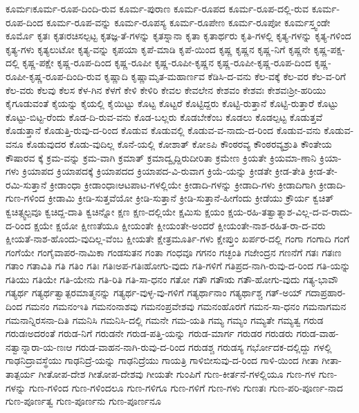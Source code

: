 {ಕೂರ್ಮಃಕೂರ್ಮ-ರೂಪ-ದಿಂದಿ-ರುವ
ಕೂರ್ಮ-ಪುರಾಣ
ಕೂರ್ಮ-ರೂಪದ
ಕೂರ್ಮ-ರೂಪ-ದಲ್ಲಿ-ರುವ
ಕೂರ್ಮ-ರೂಪ-ದಿಂದ
ಕೂರ್ಮ-ರೂಪ-ವನ್ನು
ಕೂರ್ಮ-ರೂಪಸ್ಯ
ಕೂರ್ಮ-ರೂಪೇಣ
ಕೂರ್ಮ-ರೂಪೋ
ಕೂರ್ಮಸ್ತ್ವಂಡೇ
ಕೂರ್ಮೊ
ಕೃತಃ
ಕೃತಃರಚಿಸಲ್ಪಟ್ಟ
ಕೃತಜ್ಞ-ತೆ-ಗಳನ್ನು
ಕೃತಸ್ನಾನಾ
ಕೃತಾ
ಕೃತಾರ್ಥರು
ಕೃತಿ-ಗಳಲ್ಲಿ
ಕೃತ್ಯ-ಗಳನ್ನು
ಕೃತ್ಯ-ಗಳಿಂದ
ಕೃತ್ಯ-ಗಳು
ಕೃತ್ಯಲುಟೋ
ಕೃತ್ಯ-ವನ್ನು
ಕೃಪಯಾ
ಕೃಪೆ-ಮಾಡಿ
ಕೃಪೆ-ಯಿಂದ
ಕೃಷ್ಣ
ಕೃಷ್ಣನ
ಕೃಷ್ಣ-ನಿಗೆ
ಕೃಷ್ಣನೇ
ಕೃಷ್ಣ-ಪಕ್ಷ-ದಲ್ಲಿ
ಕೃಷ್ಣ-ಪಕ್ಷೇ
ಕೃಷ್ಣ-ರೂಪ-ದಿಂದ
ಕೃಷ್ಣ-ರೂಪೀ
ಕೃಷ್ಣ-ರೂಪೀ-ಕೃಷ್ಣನ
ಕೃಷ್ಣ-ರೂಪೀ-ಕೃಷ್ಣ-ರೂಪ-ದಿಂದ
ಕೃಷ್ಣ-ರೂಪೀ-ಕೃಷ್ಣ-ರೂಪ-ದಿಂದಿ-ರುವ
ಕೃಷ್ಣಾದಿ
ಕೃಷ್ಣಾಮೃತ-ಮಹಾರ್ಣವ
ಕೆಡಿಸಿ-ದ-ವನು
ಕೆಲ-ವಕ್ಕೆ
ಕೆಲ-ವರ
ಕೆಲ-ವ-ರಿಗೆ
ಕೆಲ-ವರು
ಕೆಲವು
ಕೆಲಸ
ಕೆಳ-ಗಿನ
ಕೆಳಗೆ
ಕೇಳಿ
ಕೇಳಿರಿ
ಕೇವಲ
ಕೇವಲೇನ
ಕೇಶವಂ
ಕೇಶವಃ
ಕೇಶವಃಶ್ರೀ-ಹರಿಯು
ಕೈಗೂಡುವಂತೆ
ಕೈಯನ್ನು
ಕೈಯಲ್ಲಿ
ಕೈಯಿಟ್ಟು
ಕೊಟ್ಟ
ಕೊಟ್ಟರೆ
ಕೊಟ್ಟಿದ್ದರು
ಕೊಟ್ಟಿ-ರುತ್ತಾನೆ
ಕೊಟ್ಟಿ-ರುತ್ತಾರೆ
ಕೊಟ್ಟು
ಕೊಟ್ಟು-ಬಿಟ್ಟ-ರೆಂದು
ಕೊಡ-ದಿ-ರುವ-ವನು
ಕೊಡ-ಬಲ್ಲರು
ಕೊಡಬೇಕೆಂಬ
ಕೊಡಲು
ಕೊಡಲ್ಪಟ್ಟ
ಕೊಡುತ್ತವೆ
ಕೊಡುತ್ತಾನೆ
ಕೊಡುತ್ತಿ-ರುವು-ದ-ರಿಂದ
ಕೊಡುವ
ಕೊಡುವಲ್ಲಿ
ಕೊಡುವ-ವ-ನಾದು-ದ-ರಿಂದ
ಕೊಡುವ-ವನು
ಕೊಡುವ-ವನೂ
ಕೊಡುವುದರ
ಕೊಡು-ವುದಿಲ್ಲ
ಕೊನೆ-ಯಲ್ಲಿ
ಕೋಶಾತ್
ಕೋಽಪಿ
ಕೌಂಠರವ್ಯ
ಕೌಂಠರವ್ಯಶ್ರುತಿ
ಕೌಂತೇಯ
ಕೌಷಾರವ
ಕ್ಕೆ
ಕ್ರಮ-ವನ್ನು
ಕ್ರಮ-ವಾಗಿ
ಕ್ರಮಾತ್
ಕ್ರಮಾದ್ವೃದ್ದಿರುದೀರಿತಾ
ಕ್ರಮೇಣ
ಕ್ರಿಯತೇ
ಕ್ರಿಯಮಾ-ಣಾನಿ
ಕ್ರಿಯಾ-ಗಳು
ಕ್ರಿಯಾಪದ
ಕ್ರಿಯಾಪದಕ್ಕೆ
ಕ್ರಿಯಾಪದದ
ಕ್ರಿಯಾಪದ-ವಿ-ರುವಾಗ
ಕ್ರಿಯೆ-ಯನ್ನು
ಕ್ರೀಡತೇ
ಕ್ರೀಡ-ತೇತಿ
ಕ್ರೀಡ-ತೇ-ರಮಿ-ಸುತ್ತಾನೆ
ಕ್ರೀಡಾಂಧಾ
ಕ್ರೀಡಾಂಧಾಃಆಟಪಾಟ-ಗಳಲ್ಲಿಯೇ
ಕ್ರೀಡಾದಿ-ಗಳನ್ನು
ಕ್ರೀಡಾದಿ-ಗಳು
ಕ್ರೀಡಾದಿಗಾಗಿ
ಕ್ರೀಡಾದಿ-ಗುಣ-ಗಳಿಂದ
ಕ್ರೀಡಾಮಿ
ಕ್ರೀಡಿ-ಸುತ್ತವೆಯೋ
ಕ್ರೀಡಿ-ಸುತ್ತಾನೆ
ಕ್ರೀಡಿ-ಸುತ್ತಾನೆ-ಹೀಗೆಂದು
ಕ್ರೀಡೆಯು
ಕ್ರೌರ್ಯ
ಕ್ವಚಿತ್
ಕ್ವಚಿತ್ಸ್ವಲ್ಪವೂ
ಕ್ವಚಿದ್ದ-ದಾತಿ
ಕ್ವಚಿನ್ನೋ
ಕ್ಷಣ
ಕ್ಷಣ-ದಲ್ಲಿಯೇ
ಕ್ಷಮಿಸು
ಕ್ಷಯಂ
ಕ್ಷಯ-ರಹಿ-ತತ್ವಾತ್ನಾಶ-ವಿಲ್ಲ-ದ-ವ-ರಾದು-ದ-ರಿಂದ
ಕ್ಷಯೇ
ಕ್ಷಯೋ
ಕ್ಷೀಣತೆಯೂ
ಕ್ಷೀಯಂತೇ
ಕ್ಷೀಯಂತೇ-ಅಂದರೆ
ಕ್ಷೀಯಂತೇ-ನಾಶ-ರಹಿತ-ರಾ-ದ-ವರು
ಕ್ಷೀಯತೆ-ನಾಶ-ಹೊಂದು-ವುದಿಲ್ಲ-ವೆಂಬ
ಕ್ಷೀಯತೇ
ಕ್ಷೇತ್ರಮೂರ್ತಿ-ಗಳು
ಕ್ಷೇಪ್ತುಂ
ಖರ್ಪರ-ದಲ್ಲಿ
ಗಂಗಾ
ಗಂಗಾದಿ
ಗಂಗೆ
ಗಂಗೆಯೇ
ಗಂಗೈವಾಪರ-ನಾಮಿಕಾ
ಗಂಡಸುತನ
ಗಂತಾ
ಗಂಧವೂ
ಗಗನಂ
ಗಚ್ಛಂತಿ
ಗಜೇಂದ್ರನ
ಗಣನೆಗೆ
ಗತಃ
ಗತಃಣ
ಗತಾಂ
ಗತಾವಿತಿ
ಗತಿ
ಗತಿಂ
ಗತಿಃ
ಗತಿಃಅಪ-ಗತಿಃಹೋಗು-ವುದು
ಗತಿ-ಗಳಿಗೆ
ಗತಿಪ್ರದ-ನಾಗಿ-ರುವು-ದ-ರಿಂದ
ಗತಿ-ಯನ್ನು
ಗತಿಯು
ಗತಿಯೇ
ಗತಿ-ಯೇನು
ಗತಿ-ರಿತಿ
ಗತಿ-ಸಾ-ಧನಂ
ಗತೋ
ಗತೌ
ಗತೌಋ
ಗತೌ-ಹೋಗು-ವುದು
ಗತ್ಯ-ಭಾವೌ
ಗತ್ಯರ್ಥ
ಗತ್ಯರ್ಥತ್ವಾತ್ಪರಮಾತ್ಮನನ್ನು
ಗತ್ಯರ್ಥ-ವುಳ್ಳ-ವು-ಗಳಿಗೆ
ಗತ್ಯರ್ಥಾನಾಂ
ಗತ್ಯರ್ಥಾಶ್ಚ
ಗತ್‌-ಅಯ್
ಗದಾಪ್ರಹಾರ-ದಿಂದ
ಗಮನಂ
ಗಮನಂಇತಿ
ಗಮನಂನಾಶವು
ಗಮನಂಪ್ರವೇಶವು
ಗಮನಂಹೊರಗೆ
ಗಮನ-ಸಾ-ಧನಂ
ಗಮನಾಗಮನ
ಗಮನಾನ್ನಿರಸನಾ-ದಿತಿ
ಗಮನಿಸಿ
ಗಮನಿಸಿ-ದಲ್ಲಿ
ಗಮನೇ
ಗಮ-ಯತಿ
ಗಮ್ಯ
ಗಮ್ಯಂ
ಗಮ್ಯತೇ
ಗಮ್ಯತ್ವ
ಗರುಡ
ಗರುಡಃಅದರಂತೆ
ಗರುಡ-ನಿಗೆ
ಗರುಡನೇ
ಗರುಡ-ಪತ್ತಿ-ಯನ್ನು
ಗರುಡ-ಮಾರ್ಗ
ಗರುಡರ
ಗರುಡರು
ಗರುಡ-ವಾಹ-ನತ್ವಾನ್ನಾರಾ-ಯ-ಣಃಆ
ಗರುಡ-ವಾಹನ-ನಾಗಿ-ರುವು-ದ-ರಿಂದ
ಗರುಡಶ್ಚ
ಗರುಡಸ್ಯ
ಗರ್ಭೋದಕ-ದಲ್ಲಿದ್ದು
ಗಳಲ್ಲಿ
ಗಾಢನಿದ್ರಾವಸ್ಥೆಯು
ಗಾಢನಿದ್ರೆ-ಯನ್ನು
ಗಾಢನಿದ್ರೆಯು
ಗಾಯತ್ರಿ
ಗಾಳಿಬೀಸುವು-ದ-ರಿಂದ
ಗಾಳಿ-ಯಿಂದ
ಗೀತಾ
ಗೀತಾ-ತಾತ್ಪರ್ಯ
ಗೀತೋಪ-ದೇಶ
ಗೀತೋಪ-ದೇಶವು
ಗೀಯತೇ
ಗುಂಪಿಗೆ
ಗುಣ-ಕೀರ್ತನೆ-ಗಳಲ್ಲಿಯೂ
ಗುಣ-ಗಳ
ಗುಣ-ಗಳನ್ನು
ಗುಣ-ಗಳಿಂದ
ಗುಣ-ಗಳಿಂದಲೂ
ಗುಣ-ಗಳಿಗೂ
ಗುಣ-ಗಳಿಗೆ
ಗುಣ-ಗಳು
ಗುಣತಃ
ಗುಣ-ಪರಿ-ಪೂರ್ಣ-ನಾದ
ಗುಣ-ಪೂರ್ಣತ್ವ
ಗುಣ-ಪೂರ್ಣನು
ಗುಣ-ಪೂರ್ಣನೂ
}
